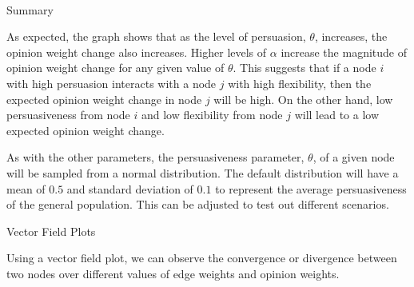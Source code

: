 \documentclass[11pt]{article}
\begin{document}
    \begin{center}
    \end{center}
    { \hspace*{\fill} \\}
    
    Summary

As expected, the graph shows that as the level of persuasion,
\(\theta\), increases, the opinion weight change also increases. Higher
levels of \(\alpha\) increase the magnitude of opinion weight change for
any given value of \(\theta\). This suggests that if a node \(i\) with
high persuasion interacts with a node \(j\) with high flexibility, then
the expected opinion weight change in node \(j\) will be high. On the
other hand, low persuasiveness from node \(i\) and low flexibility from
node \(j\) will lead to a low expected opinion weight change.

As with the other parameters, the persuasiveness parameter, \(\theta\),
of a given node will be sampled from a normal distribution. The default
distribution will have a mean of \(0.5\) and standard deviation of
\(0.1\) to represent the average persuasiveness of the general
population. This can be adjusted to test out different scenarios.

    Vector Field Plots

Using a vector field plot, we can observe the convergence or divergence
between two nodes over different values of edge weights and opinion
weights.
\end{document}
